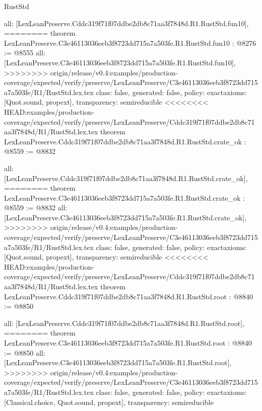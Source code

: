 \begin{lexlean}{RustStd}
\begin{coremodule}
{\begin{coremodule}
{{{{{{{{{{{{{  all: [LexLeanPreserve.Cddc319f71f07ddbe2db8c71aa3f7848d.R1.RustStd.fun10],
========
theorem LexLeanPreserve.C3e46113036eeb3f8723dd715a7a503fe.R1.RustStd.fun10 : @8276 := @8555 {
  all: [LexLeanPreserve.C3e46113036eeb3f8723dd715a7a503fe.R1.RustStd.fun10],
>>>>>>>> origin/release/v0.4:examples/production-coverage/expected/verify/preserve/LexLeanPreserve/C3e46113036eeb3f8723dd715a7a503fe/R1/RustStd.lex.tex
  class: false,
  generated: false,
  policy: exact{axioms: [Quot.sound, propext]},
  transparency: semireducible
}
<<<<<<<< HEAD:examples/production-coverage/expected/verify/preserve/LexLeanPreserve/Cddc319f71f07ddbe2db8c71aa3f7848d/R1/RustStd.lex.tex
theorem LexLeanPreserve.Cddc319f71f07ddbe2db8c71aa3f7848d.R1.RustStd.crate_ok : @8559 := @8832 {
  all: [LexLeanPreserve.Cddc319f71f07ddbe2db8c71aa3f7848d.R1.RustStd.crate_ok],
========
theorem LexLeanPreserve.C3e46113036eeb3f8723dd715a7a503fe.R1.RustStd.crate_ok : @8559 := @8832 {
  all: [LexLeanPreserve.C3e46113036eeb3f8723dd715a7a503fe.R1.RustStd.crate_ok],
>>>>>>>> origin/release/v0.4:examples/production-coverage/expected/verify/preserve/LexLeanPreserve/C3e46113036eeb3f8723dd715a7a503fe/R1/RustStd.lex.tex
  class: false,
  generated: false,
  policy: exact{axioms: [Quot.sound, propext]},
  transparency: semireducible
}
<<<<<<<< HEAD:examples/production-coverage/expected/verify/preserve/LexLeanPreserve/Cddc319f71f07ddbe2db8c71aa3f7848d/R1/RustStd.lex.tex
theorem LexLeanPreserve.Cddc319f71f07ddbe2db8c71aa3f7848d.R1.RustStd.root : @8840 := @8850 {
  all: [LexLeanPreserve.Cddc319f71f07ddbe2db8c71aa3f7848d.R1.RustStd.root],
========
theorem LexLeanPreserve.C3e46113036eeb3f8723dd715a7a503fe.R1.RustStd.root : @8840 := @8850 {
  all: [LexLeanPreserve.C3e46113036eeb3f8723dd715a7a503fe.R1.RustStd.root],
>>>>>>>> origin/release/v0.4:examples/production-coverage/expected/verify/preserve/LexLeanPreserve/C3e46113036eeb3f8723dd715a7a503fe/R1/RustStd.lex.tex
  class: false,
  generated: false,
  policy: exact{axioms: [Classical.choice, Quot.sound, propext]},
  transparency: semireducible
}

}}}}}}}}}}}}}}}
\end{coremodule}}
\end{coremodule}
\end{lexlean}
